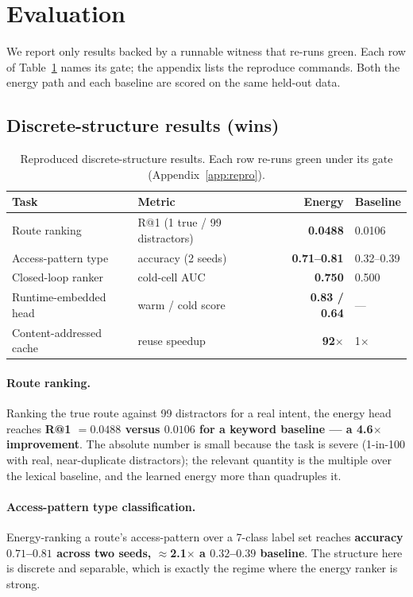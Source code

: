 \documentclass[11pt]{article}
\begin{document}
\section{Evaluation}
We report only results backed by a runnable witness that re-runs green. Each row of
Table~\ref{tab:wins} names its gate; the appendix lists the reproduce commands.
Both the energy path and each baseline are scored on the same held-out data.

\subsection{Discrete-structure results (wins)}
\begin{table}[h]
\centering
\begin{tabular}{llrl}
\toprule
Task & Metric & Energy & Baseline \\
\midrule
Route ranking & R@1 (1 true / 99 distractors) & \textbf{0.0488} & 0.0106 \\
Access-pattern type & accuracy (2 seeds) & \textbf{0.71--0.81} & 0.32--0.39 \\
Closed-loop ranker & cold-cell AUC & \textbf{0.750} & 0.500 \\
Runtime-embedded head & warm / cold score & \textbf{0.83 / 0.64} & --- \\
Content-addressed cache & reuse speedup & \textbf{92$\times$} & 1$\times$ \\
\bottomrule
\end{tabular}
\caption{Reproduced discrete-structure results. Each row re-runs green under its
gate (Appendix~\ref{app:repro}).}
\label{tab:wins}
\end{table}

\paragraph{Route ranking.} Ranking the true route against 99 distractors for a real
intent, the energy head reaches \textbf{R@1 $=0.0488$ versus $0.0106$ for a keyword
baseline --- a 4.6$\times$ improvement}. The absolute number is small because the
task is severe (1-in-100 with real, near-duplicate distractors); the relevant
quantity is the multiple over the lexical baseline, and the learned energy more than
quadruples it.

\paragraph{Access-pattern type classification.} Energy-ranking a route's
access-pattern over a 7-class label set reaches \textbf{accuracy $0.71$--$0.81$
across two seeds, $\approx$2.1$\times$ a $0.32$--$0.39$ baseline}. The structure
here is discrete and separable, which is exactly the regime where the energy
ranker is strong.
\end{document}

